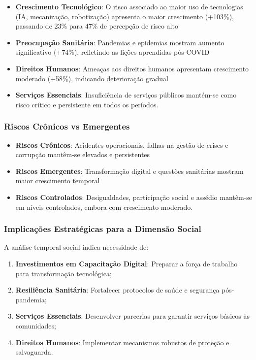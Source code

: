 \documentclass[
  portuguese,
  letterpaper,
  DIV=11,
  numbers=noendperiod]{scrreprt}
\providecommand{\tightlist}{%
  \setlength{\itemsep}{0pt}\setlength{\parskip}{0pt}}
\begin{document}
\begin{itemize}
\tightlist
\item
  \textbf{Crescimento Tecnológico}: O risco associado ao maior uso de
  tecnologias (IA, mecanização, robotização) apresenta o maior
  crescimento (+103\%), passando de 23\% para 47\% de percepção de risco
  alto
\item
  \textbf{Preocupação Sanitária}: Pandemias e epidemias mostram aumento
  significativo (+74\%), refletindo as lições aprendidas pós-COVID
\item
  \textbf{Direitos Humanos}: Ameaças aos direitos humanos apresentam
  crescimento moderado (+58\%), indicando deterioração gradual
\item
  \textbf{Serviços Essenciais}: Insuficiência de serviços públicos
  mantém-se como risco crítico e persistente em todos os períodos.
\end{itemize}

\subsubsection{Riscos Crônicos vs
Emergentes}\label{riscos-cruxf4nicos-vs-emergentes}

\begin{itemize}
\tightlist
\item
  \textbf{Riscos Crônicos}: Acidentes operacionais, falhas na gestão de
  crises e corrupção mantêm-se elevados e persistentes
\item
  \textbf{Riscos Emergentes}: Transformação digital e questões
  sanitárias mostram maior crescimento temporal
\item
  \textbf{Riscos Controlados}: Desigualdades, participação social e
  assédio mantêm-se em níveis controlados, embora com crescimento
  moderado.
\end{itemize}

\subsubsection{Implicações Estratégicas para a Dimensão
Social}\label{implicauxe7uxf5es-estratuxe9gicas-para-a-dimensuxe3o-social}

A análise temporal social indica necessidade de:

\begin{enumerate}
\def\labelenumi{\arabic{enumi}.}
\tightlist
\item
  \textbf{Investimentos em Capacitação Digital}: Preparar a força de
  trabalho para transformação tecnológica;
\item
  \textbf{Resiliência Sanitária}: Fortalecer protocolos de saúde e
  segurança pós-pandemia;
\item
  \textbf{Serviços Essenciais}: Desenvolver parcerias para garantir
  serviços básicos às comunidades;
\item
  \textbf{Direitos Humanos}: Implementar mecanismos robustos de proteção
  e salvaguarda.
\end{enumerate}
\end{document}
